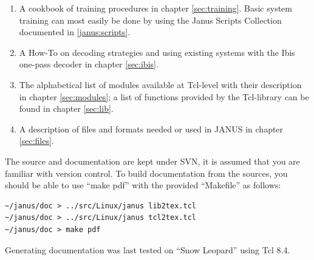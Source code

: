 \documentclass[a4paper,twoside]{book}
\begin{document}
\begin{enumerate}

\item A cookbook of training procedures in chapter \ref{sec:training}. Basic
  system training can most easily be done by using the Janus Scripts Collection
  documented in \ref{janus:scripts}.

\item A How-To on decoding strategies and using existing systems with the 
  Ibis one-pass decoder in chapter \ref{sec:ibis}.

\item The alphabetical list of modules available at Tcl-level with
  their description in chapter \ref{sec:modules}; a list of
  functions provided by the Tcl-library can be found in chapter \ref{sec:lib}.

\item A description of files and formats needed or used in JANUS
  in chapter \ref{sec:files}.

\end{enumerate}


The source and documentation are kept under SVN, it is assumed that you are
familiar with version control. To build documentation from the
sources, you should be able to use ``make pdf'' with the provided
``Makefile'' as follows:

\begin{verbatim}
~/janus/doc > ../src/Linux/janus lib2tex.tcl
~/janus/doc > ../src/Linux/janus tcl2tex.tcl
~/janus/doc > make pdf
\end{verbatim}

Generating documentation was last tested on ``Snow Leopard'' using Tcl 8.4.





\end{document}
